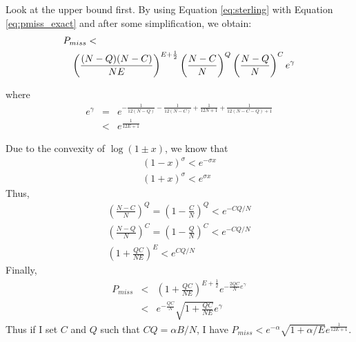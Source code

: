 \documentclass[9.5pt,journal,final,finalsubmission,twocolumn]{IEEEtran}
\begin{document}
\iffalse

Look at the upper bound first.  By using Equation \ref{eq:sterling} with
Equation \ref{eq:pmiss_exact} and after some simplification, we obtain:
\begin{eqnarray*}
\lefteqn{P_{miss} <}\\
& &\left(\frac{(N-Q)(N-C)}{NE}\right)^{E+\frac{1}{2}} \left(\frac{N-C}{N}\right)^{Q} \left(\frac{N-Q}{N}\right)^{C} e^{\gamma}\\
\end{eqnarray*}

where 
\begin{eqnarray}
e^{\gamma}&=&e^{-\frac{1}{12(N-Q)}-\frac{1}{12(N-C)}+\frac{1}{12N+1}+\frac{1}{12(N-C-Q)+1}}\\
          &<& e^{\frac{1}{12E+1}}
\end{eqnarray}

Due to the convexity of $\log{(1\pm x)}$, we know that
\begin{eqnarray}
(1-x)^\sigma<e^{-\sigma x}\\
(1+x)^\sigma<e^{\sigma x}
\end{eqnarray}
Thus, 
\begin{eqnarray}
\left(\frac{N-C}{N}\right)^{Q} = \left(1-\frac{C}{N}\right)^Q < e^{-CQ/N}\\
\left(\frac{N-Q}{N}\right)^{C} = \left(1-\frac{Q}{N}\right)^C < e^{-CQ/N}\\
\left(1+\frac{QC}{NE}\right)^{E} < e^{CQ/N}
\end{eqnarray}
Finally,
\begin{eqnarray}
P_{miss} &<& \left(1+\frac{QC}{NE}\right)^{E+\frac{1}{2}} e^{-\frac{2QC}{N} e^{\gamma}}\\
         &<&e^{-\frac{QC}{N}} \sqrt{1+\frac{QC}{NE}} e^{\gamma}
\end{eqnarray}
Thus if I set $C$ and $Q$ such that $CQ=\alpha B/N$, I have $P_{miss}< e^{-\alpha}\sqrt{1+\alpha/E}e^{\frac{1}{12E+1}}$.
\end{document}
